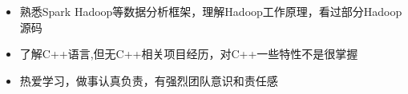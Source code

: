   \begin{itemize}[leftmargin=*]
    \item {熟悉Spark Hadoop等数据分析框架，理解Hadoop工作原理，看过部分Hadoop源码}
    \item {了解C++语言,但无C++相关项目经历，对C++一些特性不是很掌握}
    \item {热爱学习，做事认真负责，有强烈团队意识和责任感}

  \end{itemize}